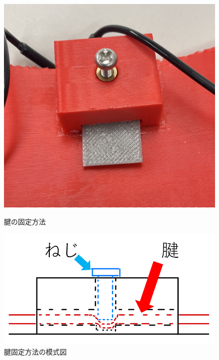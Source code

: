 \documentclass{jarticle}
\begin{document}
\begin{figure}[t]
  \begin{minipage}[b]{0.47\columnwidth}
    \centering
    \includegraphics[scale=0.17]{image/kenkotei.jpg}
    \vspace{-2mm}
    \caption{腱の固定方法}
    \label{fig:kenkotei}
  \end{minipage}
  \hspace{0.04\columnwidth}
  \begin{minipage}[b]{0.47\columnwidth}
    \centering
    \includegraphics[scale=0.17]{image/moshiki_edited.png}
    \vspace{1mm}
    \caption{腱固定方法の模式図}
    \label{fig:ken_moshiki}
  \end{minipage}
\end{figure}
\end{document}
